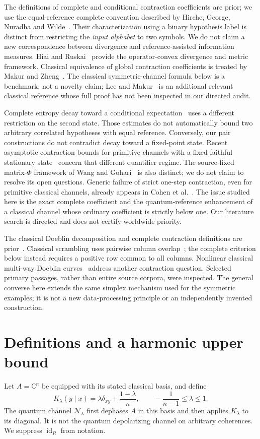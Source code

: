\documentclass[11pt]{article}
\theoremstyle{remark}\newtheorem{remark}[theorem]{Remark}
\newcommand{\id}{\operatorname{id}}
\newcommand{\N}{\mathcal N}
\begin{document}
The definitions of complete and conditional contraction coefficients are prior; we use the equal-reference complete convention described by Hirche, George, Nuradha and Wilde~\cite{HGNW}. Their characterization using a binary hypothesis label is distinct from restricting the \emph{input alphabet} to two symbols. We do not claim a new correspondence between divergence and reference-assisted information measures. Hiai and Ruskai~\cite{HR} provide the operator-convex divergence and metric framework. Classical equivalence of global contraction coefficients is treated by Makur and Zheng~\cite{MZ}. The classical symmetric-channel formula below is a benchmark, not a novelty claim; Lee and Makur~\cite{LM} is an additional relevant classical reference whose full proof has not been inspected in our directed audit.

Complete entropy decay toward a conditional expectation~\cite{GR,GJLL} uses a different restriction on the second state. Those estimates do not automatically bound two arbitrary correlated hypotheses with equal reference. Conversely, our pair constructions do not contradict decay toward a fixed-point state. Recent asymptotic contraction bounds for primitive channels with a fixed faithful stationary state~\cite{TTG} concern that different quantifier regime. The source-fixed matrix-$\Phi$ framework of Wang and Gohari~\cite{WG} is also distinct; we do not claim to resolve its open questions. Generic failure of strict one-step contraction, even for primitive classical channels, already appears in Cohen et al.~\cite{Cohen}. The issue studied here is the exact complete coefficient and the quantum-reference enhancement of a classical channel whose ordinary coefficient is strictly below one. Our literature search is directed and does not certify worldwide priority.

The classical Doeblin decomposition and complete contraction definitions are prior~\cite{GHNW,HGNW}. Classical scrambling uses pairwise column overlap~\cite{Cohen}; the complete criterion below instead requires a positive row common to all columns. Nonlinear classical multi-way Doeblin curves~\cite{DC} address another contraction question. Selected primary passages, rather than entire source corpora, were inspected. The general converse here extends the same simplex mechanism used for the symmetric examples; it is not a new data-processing principle or an independently invented construction.

\section{Definitions and a harmonic upper bound}
Let $A=\mathbb C^n$ be equipped with its stated classical basis, and define
\begin{equation}\label{eq:channel}
 K_\lambda(y\mid x)=\lambda\delta_{xy}+\frac{1-\lambda}{n},
 \qquad -\frac1{n-1}\leq\lambda\leq1.
\end{equation}
The quantum channel $\N_\lambda$ first dephases $A$ in this basis and then applies $K_\lambda$ to its diagonal. It is not the quantum depolarizing channel on arbitrary coherences. We suppress $\id_R$ from notation.
\end{document}
